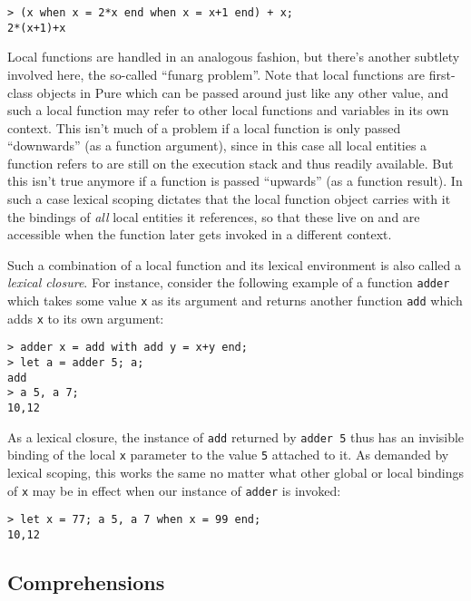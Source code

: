 \documentclass[a4paper,12pt]{article}
\begin{document}
\begin{lstlisting}
> (x when x = 2*x end when x = x+1 end) + x;
2*(x+1)+x
\end{lstlisting}

Local functions are handled in an analogous fashion, but there's another subtlety involved here, the so-called ``funarg problem''. Note that local functions are first-class objects in Pure which can be passed around just like any other value, and such a local function may refer to other local functions and variables in its own context. This isn't much of a problem if a local function is only passed ``downwards'' (as a function argument), since in this case all local entities a function refers to are still on the execution stack and thus readily available. But this isn't true anymore if a function is passed ``upwards'' (as a function result). In such a case lexical scoping dictates that the local function object carries with it the bindings of \emph{all} local entities it references, so that these live on and are accessible when the function later gets invoked in a different context.

Such a combination of a local function and its lexical environment is also called a \emph{lexical closure}. For instance, consider the following example of a function \verb|adder| which takes some value \verb|x| as its argument and returns another function \verb|add| which adds \verb|x| to its own argument:

\begin{lstlisting}
> adder x = add with add y = x+y end;
> let a = adder 5; a;
add
> a 5, a 7;
10,12
\end{lstlisting}

As a lexical closure, the instance of \verb|add| returned by \verb|adder 5| thus has an invisible binding of the local \verb|x| parameter to the value \verb|5| attached to it. As demanded by lexical scoping, this works the same no matter what other global or local bindings of \verb|x| may be in effect when our instance of \verb|adder| is invoked:

\begin{lstlisting}
> let x = 77; a 5, a 7 when x = 99 end;
10,12
\end{lstlisting}

\subsection{Comprehensions}
\label{Comprehensions}
\end{document}
